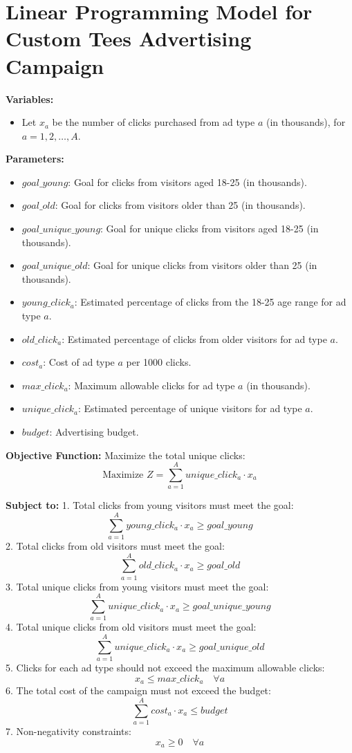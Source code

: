 \documentclass{article}
\begin{document}
\section*{Linear Programming Model for Custom Tees Advertising Campaign}

\textbf{Variables:}
\begin{itemize}
    \item Let $x_a$ be the number of clicks purchased from ad type $a$ (in thousands), for $a = 1, 2, \ldots, A$.
\end{itemize}

\textbf{Parameters:}
\begin{itemize}
    \item $goal\_young$: Goal for clicks from visitors aged 18-25 (in thousands).
    \item $goal\_old$: Goal for clicks from visitors older than 25 (in thousands).
    \item $goal\_unique\_young$: Goal for unique clicks from visitors aged 18-25 (in thousands).
    \item $goal\_unique\_old$: Goal for unique clicks from visitors older than 25 (in thousands).
    \item $young\_click_a$: Estimated percentage of clicks from the 18-25 age range for ad type $a$.
    \item $old\_click_a$: Estimated percentage of clicks from older visitors for ad type $a$.
    \item $cost_a$: Cost of ad type $a$ per 1000 clicks.
    \item $max\_click_a$: Maximum allowable clicks for ad type $a$ (in thousands).
    \item $unique\_click_a$: Estimated percentage of unique visitors for ad type $a$.
    \item $budget$: Advertising budget.
\end{itemize}

\textbf{Objective Function:}
Maximize the total unique clicks:
\[
\text{Maximize } Z = \sum_{a=1}^{A} unique\_click_a \cdot x_a
\]

\textbf{Subject to:}
1. Total clicks from young visitors must meet the goal:
\[
\sum_{a=1}^{A} young\_click_a \cdot x_a \geq goal\_young
\]
2. Total clicks from old visitors must meet the goal:
\[
\sum_{a=1}^{A} old\_click_a \cdot x_a \geq goal\_old
\]
3. Total unique clicks from young visitors must meet the goal:
\[
\sum_{a=1}^{A} unique\_click_a \cdot x_a \geq goal\_unique\_young
\]
4. Total unique clicks from old visitors must meet the goal:
\[
\sum_{a=1}^{A} unique\_click_a \cdot x_a \geq goal\_unique\_old
\]
5. Clicks for each ad type should not exceed the maximum allowable clicks:
\[
x_a \leq max\_click_a \quad \forall a
\]
6. The total cost of the campaign must not exceed the budget:
\[
\sum_{a=1}^{A} cost_a \cdot x_a \leq budget
\]
7. Non-negativity constraints:
\[
x_a \geq 0 \quad \forall a
\]
\end{document}
